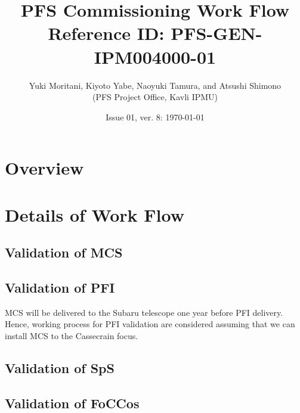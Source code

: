 \documentclass[11pt]{article}
\title{PFS Commissioning Work Flow \\
\large{Reference ID: PFS-GEN-IPM004000-01 }}
\author{Yuki Moritani, Kiyoto Yabe, Naoyuki Tamura, and Atsushi Shimono \\
(PFS Project Office, Kavli IPMU)}
\date{
Issue 01, ver. 8: \today }
\begin{document}
\maketitle
\tableofcontents

\section{Overview}


\section{Details of Work Flow}

\renewcommand{\thesubsubsection}{M-\;\arabic{subsubsection}}
\subsection{Validation of MCS}\label{sec:MCS}





\renewcommand{\thesubsubsection}{P-\;\arabic{subsubsection}}
\subsection{Validation of PFI}\label{sec:PFI}
MCS will be delivered to the Subaru telescope one year before PFI delivery.
Hence, working process for PFI validation are considered assuming that we can install MCS to the Cassecrain focus.










%
%
%

\renewcommand{\thesubsubsection}{S-\;\arabic{subsubsection}}
\subsection{Validation of SpS}\label{sec:SpS}


%

\renewcommand{\thesubsubsection}{F-\;\arabic{subsubsection}}
\subsection{Validation of FoCCos}\label{sec:FoCCoS}


\end{document}

